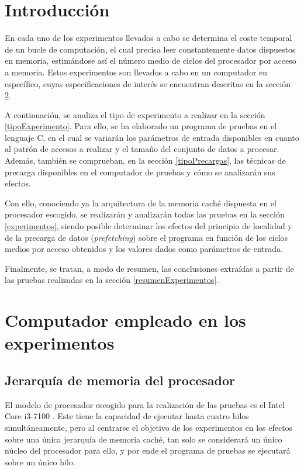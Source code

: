 \documentclass[conference]{IEEEtran}
\begin{document}

\section{Introducción}
En cada uno de los experimentos llevados a cabo se determina el coste temporal de un bucle de computación, el cual precisa leer constantemente datos dispuestos en memoria, estimándose así el número medio de ciclos del procesador por acceso a memoria. Estos experimentos son llevados a cabo en un computador en específico, cuyas especificaciones de interés se encuentran descritas en la sección \ref{descripcionComputador}.

A continuación, se analiza el tipo de experimento a realizar en la sección \ref{tipoExperimento}. Para ello, se ha elaborado un programa de pruebas en el lenguaje C, en el cual se variarán los parámetros de entrada disponibles en cuanto al patrón de accesos a realizar y el tamaño del conjunto de datos a procesar. Además, también se comprueban, en la sección \ref{tipoPrecargas}, las técnicas de precarga disponibles en el computador de pruebas y cómo se analizarán sus efectos.

Con ello, conociendo ya la arquitectura de la memoria caché dispuesta en el procesador escogido, se realizarán y analizarán todas las pruebas en la sección \ref{experimentos}, siendo posible determinar los efectos del principio de localidad y de la precarga de datos (\textit{prefetching}) sobre el programa en función de los ciclos medios por acceso obtenidos y los valores dados como parámetros de entrada.

Finalmente, se tratan, a modo de resumen, las conclusiones extraídas a partir de las pruebas realizadas en la sección \ref{resumenExperimentos}.

\section{Computador empleado en los experimentos} \label{descripcionComputador}

\subsection{Jerarquía de memoria del procesador}
El modelo de procesador escogido para la realización de las pruebas es el Intel Core i3-7100 \cite{procesador}. Este tiene la capacidad de ejecutar hasta cuatro hilos simultáneamente, pero al centrarse el objetivo de los experimentos en los efectos sobre una única jerarquía de memoria caché, tan solo se considerará un único núcleo del procesador para ello, y por ende el programa de pruebas se ejecutará sobre un único hilo.
\end{document}
